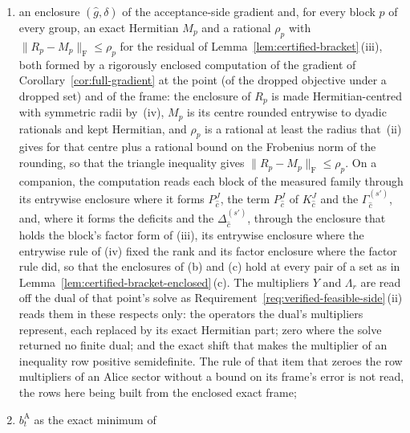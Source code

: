 \begin{requirement}
\begin{enumerate}[label=(\roman*),leftmargin=2.4em]
\begin{enumerate}[label=(\alph*),leftmargin=2.2em]
    positive (), on the exact
     $\Chacc$ of \eqref{eq:chacc-def}, which is
    also where $\hat g$ of (c) lives: for a singleton the support of its
    one point, and for a polytope the union of the supports of its exact
    vertices (Remark~\ref{rem:acc-side});
  \item an enclosure $(\hat g,\delta)$ of the acceptance-side gradient and,
    for every block $p$ of every group, an exact Hermitian $M_p$ and a
    rational $\rho_p$ with $\|R_p-M_p\|_{\mathrm F}\le\rho_p$ for the
    residual of Lemma~\ref{lem:certified-bracket}\,(iii), both formed by a
    rigorously enclosed computation of the gradient of
    Corollary~\ref{cor:full-gradient} at the point (of the dropped objective
    under a dropped set) and of the frame: the enclosure of $R_p$ is made
    Hermitian-centred with symmetric radii by
    \,(iv), $M_p$ is its centre
    rounded entrywise to dyadic rationals and kept Hermitian, and $\rho_p$
    is a rational at least the radius that
    \,(ii) gives for
    that centre plus a rational bound on the Frobenius norm of the
    rounding, so that the triangle inequality gives
    $\|R_p-M_p\|_{\mathrm F}\le\rho_p$. On a companion, the computation
    reads each block of the measured family through its entrywise enclosure
    where it forms $P^{J}_{\hat c}$, the term $P^{J}_{\hat c}$ of
    $K^{J}_{\hat c}$ and the $\Gamma^{(s')}_{\hat c}$, and, where it forms
    the deficits and the $\Delta^{(s')}_{\hat c}$, through the enclosure
    that holds the block's factor form of (iii), its entrywise enclosure
    where the entrywise rule of (iv) fixed the rank and its factor
    enclosure where the factor rule did, so that the enclosures of (b) and
    (c) hold at every pair of a set as in
    Lemma~\ref{lem:certified-bracket-enclosed}\,(c). The
    multipliers $Y$ and $\Lambda_r$ are read off the dual of that point's
    solve as Requirement~\ref{req:verified-feasible-side}\,(ii) reads them in
    these respects only: the operators the dual's multipliers represent,
    each replaced by its exact Hermitian part; zero where the solve returned
    no finite dual; and the exact shift that makes the multiplier of an
    inequality row positive semidefinite. The rule of that item that zeroes
    the row multipliers of an Alice sector without a bound on its frame's
    error is not read, the rows here being built from the enclosed exact
    frame;
  \item $b^{\mathrm A}_t$ as the exact minimum of

\end{enumerate}
\end{enumerate}
\end{requirement}
